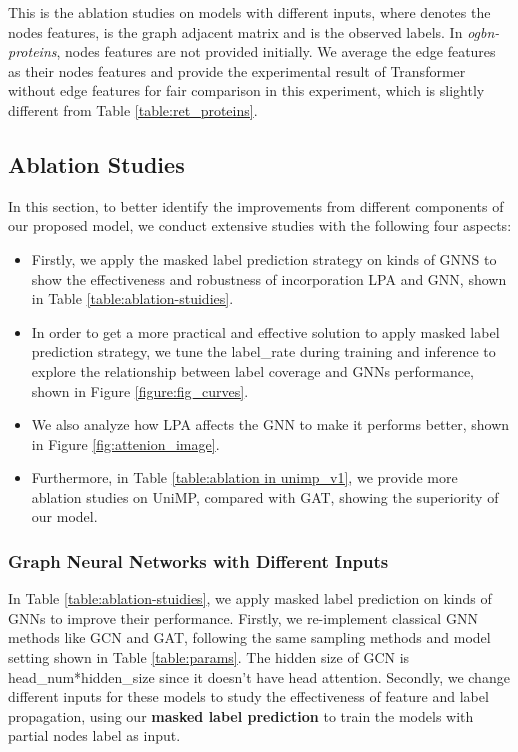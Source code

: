 \begin{table*}[htbp]
	\caption{This is the ablation studies on models with different inputs, where
 denotes the nodes features,  is the graph adjacent matrix and  is the observed labels. In \emph{ogbn-proteins}, nodes features are not provided initially. We average the edge features as their nodes features and provide the experimental result of Transformer without edge features for fair comparison in this experiment, which is slightly different from Table \ref{table:ret_proteins}.
}
 \label{table:ablation-stuidies}
 \vspace{-4mm}
\end{table*}
 
 \subsection{Ablation Studies}
 In this section, to better identify the improvements from different components of our proposed model, we conduct extensive studies with the following four aspects:
 


\begin{itemize}
 	\item Firstly, we apply the masked label prediction strategy on kinds of GNNS to show the effectiveness and robustness of incorporation LPA and GNN, shown in Table \ref{table:ablation-stuidies}.
 	\item In order to get a more practical and effective solution to apply masked label prediction strategy, we tune the label\_rate during training and inference to explore the relationship between label coverage and GNNs performance, shown in Figure \ref{figure:fig_curves}.
\item We also analyze how LPA affects the GNN to make it performs better, shown in Figure \ref{fig:attenion_image}.
 	\item Furthermore, in Table \ref{table:ablation in unimp_v1}, we provide more ablation studies on UniMP, compared with GAT, showing the superiority of our model. 
\end{itemize}
 
 
 \subsubsection{Graph Neural Networks with Different Inputs}
 In Table \ref{table:ablation-stuidies}, we apply masked label prediction on kinds of GNNs to improve their performance. Firstly, we re-implement classical GNN methods like GCN and GAT, following the same sampling methods and model setting shown in Table \ref{table:params}. The hidden size of GCN is head\_num*hidden\_size since it doesn't have head attention. Secondly, we change different inputs for these models to study the effectiveness of feature and label propagation, using our {\bf masked label prediction} to train the models with partial nodes label  as input.
  


